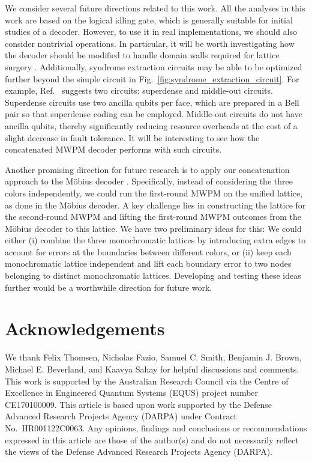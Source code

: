 \documentclass[a4paper,twocolumn,11pt,accepted=2025-01-21]{quantumarticle}
\theoremstyle{definition}
\theoremstyle{definition}
\theoremstyle{definition}
\begin{document}
We consider several future directions related to this work.
All the analyses in this work are based on the logical idling gate, which is generally suitable for initial studies of a decoder.
However, to use it in real implementations, we should also consider nontrivial operations.
In particular, it will be worth investigating how the decoder should be modified to handle domain walls required for lattice surgery \cite{kesselring2024anyon}.
Additionally, syndrome extraction circuits may be able to be optimized further beyond the simple circuit in Fig.~\ref{fig:syndrome_extraction_circuit}.
For example, Ref.~\cite{gidney2023new} suggests two circuits: superdense and middle-out circuits.
Superdense circuits use two ancilla qubits per face, which are prepared in a Bell pair so that superdense coding can be employed.
Middle-out circuits do not have ancilla qubits, thereby significantly reducing resource overheads at the cost of a slight decrease in fault tolerance.
It will be interesting to see how the concatenated MWPM decoder performs with such circuits.

Another promising direction for future research is to apply our concatenation approach to the Möbius decoder \cite{sahay2022decoder,gidney2023new}. 
Specifically, instead of considering the three colors independently, we could run the first-round MWPM on the unified lattice, as done in the Möbius decoder. 
A key challenge lies in constructing the lattice for the second-round MWPM and lifting the first-round MWPM outcomes from the Möbius decoder to this lattice.
We have two preliminary ideas for this: We could either (i) combine the three monochromatic lattices by introducing extra edges to account for errors at the boundaries between different colors, or (ii) keep each monochromatic lattice independent and lift each boundary error to two nodes belonging to distinct monochromatic lattices. 
Developing and testing these ideas further would be a worthwhile direction for future work.

\section*{Acknowledgements}

We thank Felix Thomsen, Nicholas Fazio, Samuel C. Smith, Benjamin J. Brown, Michael E. Beverland, and Kaavya Sahay for helpful discussions and comments. This work is supported by the Australian Research Council via the Centre of Excellence in Engineered Quantum Systems (EQUS) project number CE170100009.  This article is based upon work supported by the Defense Advanced Research Projects Agency (DARPA) under Contract No.\ HR001122C0063. Any opinions, findings and conclusions or recommendations expressed in this article are those of the author(s) and do not necessarily reflect the views of the Defense Advanced Research Projects Agency (DARPA).
\end{document}
